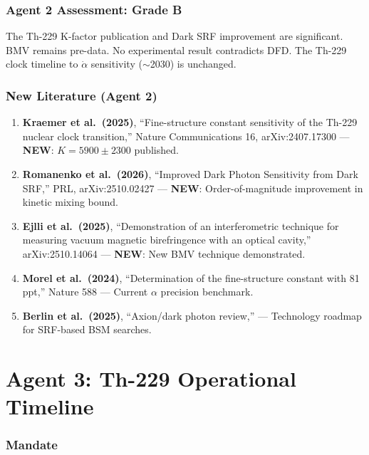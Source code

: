 \documentclass[11pt,a4paper]{article}
\newcommand{\NEW}{\textcolor{dfdblue}{\textbf{NEW}}}
\begin{document}
\section{Agent 2 Assessment: Grade B}

The Th-229 K-factor publication and Dark SRF improvement are significant. BMV remains pre-data. No experimental result contradicts DFD. The Th-229 clock timeline to $\dot{\alpha}$ sensitivity ($\sim$2030) is unchanged.

\section{New Literature (Agent 2)}

\begin{enumerate}
\item \textbf{Kraemer et al.\ (2025)}, ``Fine-structure constant sensitivity of the Th-229 nuclear clock transition,'' Nature Communications 16, arXiv:2407.17300 --- \NEW: $K = 5900 \pm 2300$ published.

\item \textbf{Romanenko et al.\ (2026)}, ``Improved Dark Photon Sensitivity from Dark SRF,'' PRL, arXiv:2510.02427 --- \NEW: Order-of-magnitude improvement in kinetic mixing bound.

\item \textbf{Ejlli et al.\ (2025)}, ``Demonstration of an interferometric technique for measuring vacuum magnetic birefringence with an optical cavity,'' arXiv:2510.14064 --- \NEW: New BMV technique demonstrated.

\item \textbf{Morel et al.\ (2024)}, ``Determination of the fine-structure constant with 81 ppt,'' Nature 588 --- Current $\alpha$ precision benchmark.

\item \textbf{Berlin et al.\ (2025)}, ``Axion/dark photon review,'' --- Technology roadmap for SRF-based BSM searches.
\end{enumerate}


\part{Agent 3: Th-229 Operational Timeline}
\label{part:agent3}

\section{Mandate}
\end{document}
